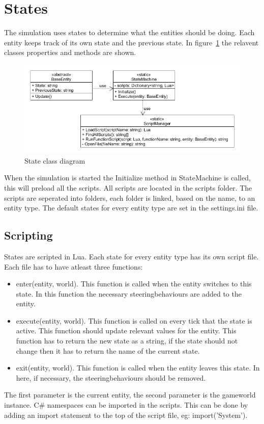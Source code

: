 \documentclass{article}
\begin{document}
 
   \newpage   
   \section {States}
   The simulation uses states to determine what the entities should be doing. Each entity keeps track of its own state and the previous state. In figure~\ref{fig:stateClassDiagram} the relavent classes properties and methods are shown. 
   \begin{figure}[h!]
   \includegraphics[width=\textwidth]{stateuml.png}
   \caption{State class diagram}
   \label{fig:stateClassDiagram}
   \end{figure}
   When the simulation is started the Initialize method in StateMachine is called, this will preload all the scripts. All scripts are located in the scripts folder. The scripts are seperated into folders, each folder is linked, based on the name, to an entity type.
   The default states for every entity type are set in the settings.ini file.
   \subsection {Scripting}
   States are scripted in Lua. Each state for every entity type has its own script file. Each file has to have atleast three functions: 
   \begin{itemize}
   \item enter(entity, world). This function is called when the entity switches to this state. In this function the necessary steeringbehaviours are added to the entity.
   \item execute(entity, world). This function is called on every tick that the state is active. This function should update relevant values for the entity. This function has to return the new state as a string, if the state should not change then it has to return the name of the current state.
   \item exit(entity, world). This function is called when the entity leaves this state. In here, if necessary, the steeringbehaviours should be removed.
   \end{itemize}
   The first parameter is the current entity, the second parameter is the gameworld instance. C\# namespaces can be imported in the scripts. This can be done by adding an import statement to the top of the script file, eg: import('System').
   
\end{document}
